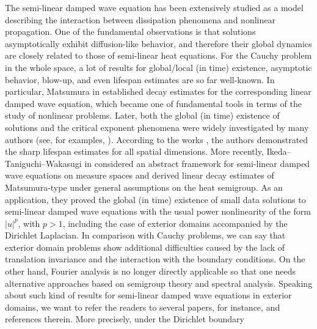 \documentclass[a4paper,11pt]{article} %
\theoremstyle{remark}
\theoremstyle{definition}
\numberwithin{equation}{section}
\begin{document}
The semi-linear damped wave equation has been extensively studied as a model describing the interaction between dissipation phenomena and nonlinear propagation. One of the fundamental observations is that solutions asymptotically exhibit diffusion-like behavior, and therefore their global dynamics are closely related to those of semi-linear heat equations. For the Cauchy problem in the whole space, a lot of results for global/local (in time) existence, asymptotic behavior, blow-up, and even lifespan estimates are so far well-known. In particular, Matsumura in \cite{Matsumura1976} established decay estimates for the corresponding linear damped wave equation, which became one of fundamental tools in terms of the study of nonlinear problems. Later, both the global (in time) existence of solutions and the critical exponent phenomena were widely investigated by many authors (see, for examples, \cite{Nishihara2003,IkehataTanizawa2005,Todorova2001}). According to the works \cite{Iked-Ogaw-2016,Lai-Zhou-2019,Fuji-Iked-Waka-2019,Iked-Waka-2020}, the authors demonstrated the sharp lifespan estimates for all spatial dimensions. More recently, Ikeda–Taniguchi–Wakasugi in \cite{IkedaTaniguchiWakasugi2023} considered an abstract framework for semi-linear damped wave equations on measure spaces and derived linear decay estimates of Matsumura-type under general assumptions on the heat semigroup. As an application, they proved the global (in time) existence of small data solutions to semi-linear damped wave equations with the usual power nonlinearity of the form $|u|^p$, with $p>1$, including the case of exterior domains accompanied by the Dirichlet Laplacian. In comparison with Cauchy problems, we can say that exterior domain problems show additional difficulties caused by the lack of translation invariance and the interaction with the boundary conditions. On the other hand, Fourier analysis is no longer directly applicable so that one needs alternative approaches based on semigroup theory and spectral analysis. Speaking about such kind of results for semi-linear damped wave equations in exterior domains, we want to refer the readers to several papers, for instance, \cite{Ikehata2005,OgawaTakeda2009,Fino2017,IkedaSobajima2019-1,IkedaJleliSamet2020,DaoIkeda2023} and references therein. More precisely, under the Dirichlet boundary
\end{document}
